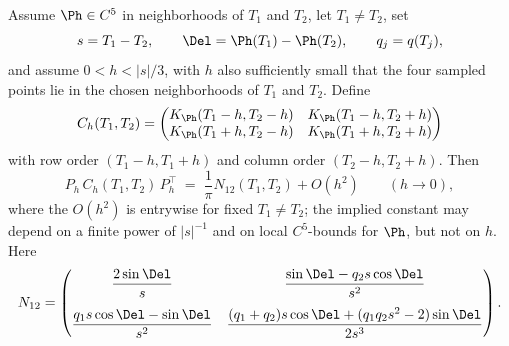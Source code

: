 \begin{lemma}
\label{lem:cross-block-jet-limit}
Assume \(\Ph\in C^5\) in neighborhoods of \(T_1\) and \(T_2\), let
\(T_1\ne T_2\), set
\[
        s = T_1 - T_2,
        \qquad \Del = \Ph(T_1)-\Ph(T_2),
        \qquad q_j = q(T_j),
\]
and assume \(0 < h < |s|/3\), with \(h\) also sufficiently small that
the four sampled points lie in the chosen neighborhoods of \(T_1\) and
\(T_2\).  Define
\[
C_h(T_1, T_2)=
\begin{pmatrix}
K_\Ph(T_1-h, T_2-h) & K_\Ph(T_1-h, T_2+h)\\
K_\Ph(T_1+h, T_2-h) & K_\Ph(T_1+h, T_2+h)
\end{pmatrix}
\]
with row order \((T_1-h, T_1+h)\) and column order \((T_2-h, T_2+h)\).
Then
\[
        P_h\,C_h(T_1, T_2)\,P_h^\top
        \;=\; \frac1\pi N_{12}(T_1, T_2) + O(h^2)
        \qquad (h\to 0),
\]
where the \(O(h^2)\) is entrywise for fixed \(T_1\ne T_2\); the implied
constant may depend on a finite power of \(|s|^{-1}\) and on local
\(C^5\)-bounds for \(\Ph\), but not on \(h\).  Here
\begin{equation}
\label{eq:cross-N12}
N_{12}=
\begin{pmatrix}
\dfrac{2\sin\Del}{s}
&
\dfrac{\sin\Del - q_2 s\cos\Del}{s^2}
\\[2.4ex]
\dfrac{q_1 s\cos\Del - \sin\Del}{s^2}
&
\dfrac{(q_1+q_2)s\cos\Del + (q_1 q_2 s^2 - 2)\sin\Del}{2s^3}
\end{pmatrix}.
\end{equation}
\end{lemma}

